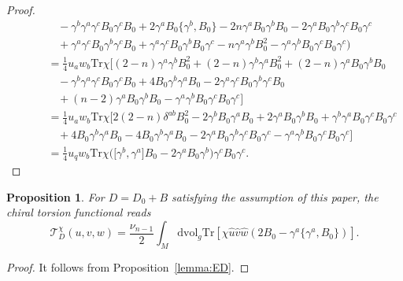 \documentclass[10pt,a4paper]{amsart}
\numberwithin{equation}{section}
\newtheorem{Proposition}[Theorem]{Proposition}
\theoremstyle{definition}
\def\Tr{\mathrm{Tr}}
\def\dv{\mathrm{dvol}_g}
\begin{document}
\begin{proof}
\begin{gather*}
\phantom{\qquad+=}{}	-\gamma^b \gamma^a \gamma^c B_0 \gamma^c B_0+2\gamma^a B_0 \bigl\{\gamma^b, B_0\bigr\}-2n \gamma^a B_0 \gamma^b B_0 -2\gamma^a B_0 \gamma^b \gamma^c B_0 \gamma^c \\
\phantom{\qquad+=}{}+\gamma^a \gamma^c B_0 \gamma^b \gamma^c B_0+\gamma^a \gamma^c B_0 \gamma^b B_0 \gamma^c - n\gamma^a \gamma^b B_0^2 -\gamma^a\gamma^b B_0 \gamma^c B_0 \gamma^c\bigr)\\
\phantom{\qquad+}{} =\frac{1}{4}u_aw_b \Tr \chi\bigl[
 (2-n)\gamma^a\gamma^b B_0^2 +(2-n)\gamma^b\gamma^a B_0^2 +(2-n) \gamma^a B_0\gamma^b B_0 \\
\phantom{\qquad+=}{}-\gamma^b\gamma^a \gamma^c B_0 \gamma^c B_0+4B_0 \gamma^b \gamma^a B_0-2\gamma^a\gamma^c B_0\gamma^b \gamma^c B_0 \\
\phantom{\qquad+=}{}+(n-2)\gamma^a B_0 \gamma^b B_0 - \gamma^a \gamma^b B_0 \gamma^c B_0 \gamma^c
 \bigr]\\
 \phantom{\qquad+}{}=\frac{1}{4}u_a w_b \Tr \chi\bigl[
2(2-n) \delta^{ab}B_0^2 -2\gamma^b B_0 \gamma^a B_0 +2\gamma^a B_0 \gamma^b B_0 +\gamma^b \gamma^a B_0 \gamma^c B_0 \gamma^c \\
\phantom{\qquad+=}{} + 4 B_0 \gamma^b \gamma^a B_0-4 B_0 \gamma^b \gamma^a B_0 -2\gamma^a B_0 \gamma^b \gamma^c B_0 \gamma^c
 -\gamma^a \gamma^b B_0 \gamma^c B_0 \gamma^c\bigr]\\
 \phantom{\qquad+}{}=\frac{1}{4}u_q w_b \Tr \chi \bigl(\bigl[\gamma^b,\gamma^a\bigr]B_0 - 2\gamma^a B_0 \gamma^b\bigr) \gamma^c B_0 \gamma^c.	\tag*{\qed}
 \end{gather*} \renewcommand{\qed}{}
\end{proof}


\begin{Proposition}
	\label{prop:torchi}
 For $D = D_0+B$ satisfying the assumption of this paper, the chiral torsion functional reads
 \[
 \mathscr{T}^\chi_D(u,v,w)=\frac{\nu_{n-1}}{2}\int_M \dv \Tr\left[\chi\hat{u}\hat{v}\hat{w}(2B_0-\gamma^a\{\gamma^a,B_0\})\right].
 \]
\end{Proposition}
\begin{proof}
 It follows from Proposition~\ref{lemma:ED}.
\end{proof}
\end{document}
